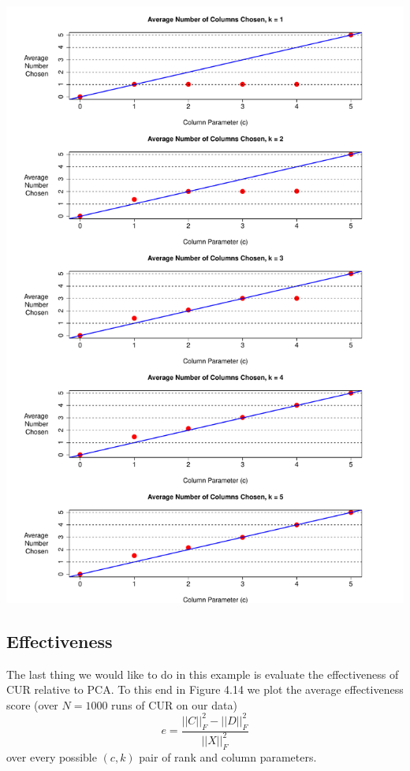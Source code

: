 \documentclass{book}
\begin{document}
\newpage
\begin{center}
\includegraphics[scale=.60]{./Figures/diag_ex_2/chosen_v_c.pdf}%
\end{center}

\subsection{Effectiveness}

The last thing we would like to do in this example is evaluate the effectiveness of CUR relative to PCA. To this end in Figure 4.14 we plot the average effectiveness score (over $N=1000$ runs of CUR on our data) 
$$
e=\frac{||C||_F^2-||D||_F^2}{||X||_F^2}
$$
over every possible $(c,k)$ pair of rank and column parameters. 
\end{document}

